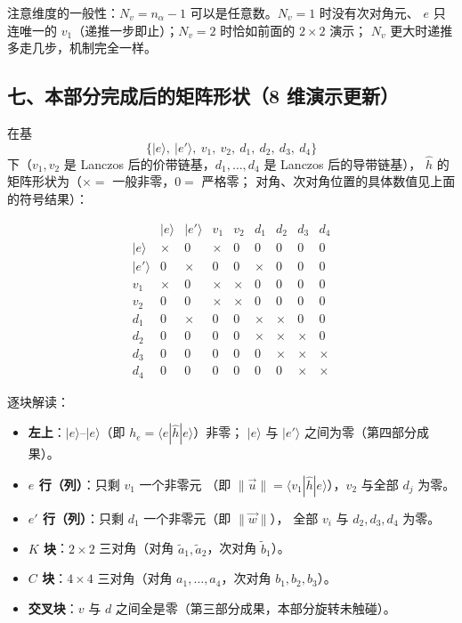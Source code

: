 \documentclass[11pt]{ctexart}
\begin{document}
注意维度的一般性：$N_v=n_\alpha-1$ 可以是任意数。$N_v=1$ 时没有次对角元、
$e$ 只连唯一的 $v_1$（递推一步即止）；$N_v=2$ 时恰如前面的 $2\times2$ 演示；
$N_v$ 更大时递推多走几步，机制完全一样。

\subsection{七、本部分完成后的矩阵形状（8 维演示更新）}

在基
\[
\big\{|e\rangle,\ |e'\rangle,\ v_1,\ v_2,\ d_1,\ d_2,\ d_3,\ d_4\big\}
\]
下（$v_1,v_2$ 是 Lanczos 后的价带链基，$d_1,\dots,d_4$ 是 Lanczos 后的导带链基），
$\hat h$ 的矩阵形状为（$\times=$ 一般非零，$0=$ 严格零；
对角、次对角位置的具体数值见上面的符号结果）：

\[
\begin{array}{c|cccccccc}
 & |e\rangle & |e'\rangle & v_1 & v_2 & d_1 & d_2 & d_3 & d_4\\[2pt]
\hline
|e\rangle & \times & 0 & \times & 0 & 0 & 0 & 0 & 0\\[2pt]
|e'\rangle & 0 & \times & 0 & 0 & \times & 0 & 0 & 0\\[2pt]
v_1 & \times & 0 & \times & \times & 0 & 0 & 0 & 0\\[2pt]
v_2 & 0 & 0 & \times & \times & 0 & 0 & 0 & 0\\[2pt]
d_1 & 0 & \times & 0 & 0 & \times & \times & 0 & 0\\[2pt]
d_2 & 0 & 0 & 0 & 0 & \times & \times & \times & 0\\[2pt]
d_3 & 0 & 0 & 0 & 0 & 0 & \times & \times & \times\\[2pt]
d_4 & 0 & 0 & 0 & 0 & 0 & 0 & \times & \times
\end{array}
\]

逐块解读：

\begin{itemize}
\item \textbf{左上}：$|e\rangle$--$|e\rangle$（即 $h_e=\langle e|\hat h|e\rangle$）非零；
$|e\rangle$ 与 $|e'\rangle$ 之间为零（第四部分成果）。
\item \textbf{$e$ 行（列）}：只剩 $v_1$ 一个非零元
（即 $\|\vec u\|=\langle v_1|\hat h|e\rangle$），$v_2$ 与全部 $d_j$ 为零。
\item \textbf{$e'$ 行（列）}：只剩 $d_1$ 一个非零元（即 $\|\vec w\|$），
全部 $v_i$ 与 $d_2,d_3,d_4$ 为零。
\item \textbf{$K$ 块}：$2\times2$ 三对角（对角 $\tilde a_1,\tilde a_2$，次对角 $\tilde b_1$）。
\item \textbf{$C$ 块}：$4\times4$ 三对角（对角 $a_1,\dots,a_4$，次对角 $b_1,b_2,b_3$）。
\item \textbf{交叉块}：$v$ 与 $d$ 之间全是零（第三部分成果，本部分旋转未触碰）。
\end{itemize}
\end{document}
